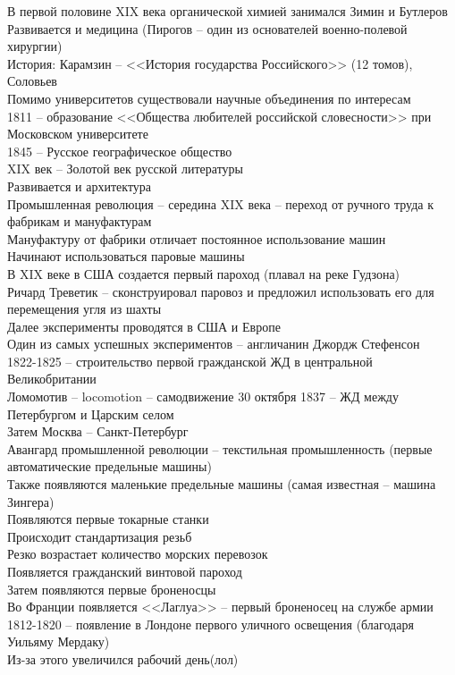 \documentclass[12pt]{article}
\begin{document}
В первой половине XIX века органической химией занимался Зимин и Бутлеров\\
Развивается и медицина (Пирогов -- один из основателей военно-полевой хирургии)\\
История: Карамзин -- <<История государства Российского>> (12 томов), Соловьев\\
Помимо университетов существовали научные объединения по интересам\\
1811 -- образование <<Общества любителей российской словесности>> при Московском университете\\
1845 -- Русское географическое общество\\
XIX век -- Золотой век русской литературы\\
Развивается и архитектура\\
Промышленная революция -- середина XIX века -- переход от ручного труда к фабрикам и мануфактурам\\
Мануфактуру от фабрики отличает постоянное использование машин\\
Начинают использоваться паровые машины\\
В XIX веке в США создается первый пароход (плавал на реке Гудзона)\\
Ричард Треветик -- сконструировал паровоз и предложил использовать его для перемещения угля из шахты\\
Далее эксперименты проводятся в США и Европе\\
Один из самых успешных экспериментов -- англичанин Джордж Стефенсон\\
1822-1825 -- строительство первой гражданской ЖД в центральной Великобритании\\
Ломомотив -- locomotion -- самодвижение
30 октября 1837 -- ЖД между Петербургом и Царским селом\\
Затем Москва -- Санкт-Петербург\\
Авангард промышленной революции -- текстильная промышленность (первые автоматические предельные машины)\\
Также появляются маленькие предельные машины (самая известная -- машина Зингера)\\
Появляются первые токарные станки\\
Происходит стандартизация резьб\\
Резко возрастает количество морских перевозок\\
Появляется гражданский винтовой пароход\\
Затем появляются первые броненосцы\\
Во Франции появляется <<Лаглуа>> -- первый броненосец на службе армии\\
1812-1820 -- появление в Лондоне первого уличного освещения (благодаря Уильяму Мердаку)\\
Из-за этого увеличился рабочий день(лол)
\end{document}
